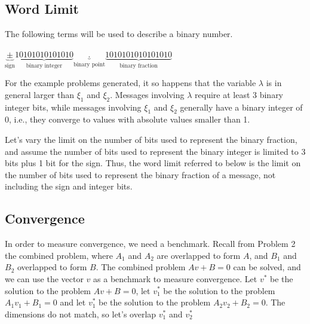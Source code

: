\documentclass[12pt]{article}
\begin{document}
\subsection*{Word Limit}

The following terms will be used to describe a binary number.
\begin{center}
	$\underbrace{\pm}_{\text{sign}}\underbrace{10101010101010}_{\text{binary integer}}\underbrace{.}_{\text{binary point}}\underbrace{1010101010101010}_{\text{binary fraction}}$
\end{center}


For the example problems generated, it so happens that the variable $\lambda$ is in general larger than $\xi_1$ and $\xi_2$. Messages involving $\lambda$ require at least 3 binary integer bits, while messages involving $\xi_1$ and $\xi_2$ generally have a binary integer of 0, i.e., they converge to values with absolute values smaller than 1.

Let's vary the limit on the number of bits used to represent the binary fraction, and assume the number of bits used to represent the binary integer is limited to 3 bits plus 1 bit for the sign. Thus, the word limit referred to below is the limit on the number of bits used to represent the binary fraction of a message, not including the sign and integer bits.

\subsection*{Convergence}

In order to measure convergence, we need a benchmark. Recall from Problem 2 the combined problem, where $A_1$ and $A_2$ are overlapped to form $A$, and $B_1$ and $B_2$ overlapped to form $B$. The combined problem $Av+B=0$ can be solved, and we can use the vector $v$ as a benchmark to measure convergence. Let $v^*$ be the solution to the problem $Av+B=0$, let $v_1^*$ be the solution to the problem $A_1v_1+B_1=0$ and let $v_1^*$ be the solution to the problem $A_2v_2+B_2=0$. The dimensions do not match, so let's overlap $v_1^*$ and $v_2^*$
\end{document}
